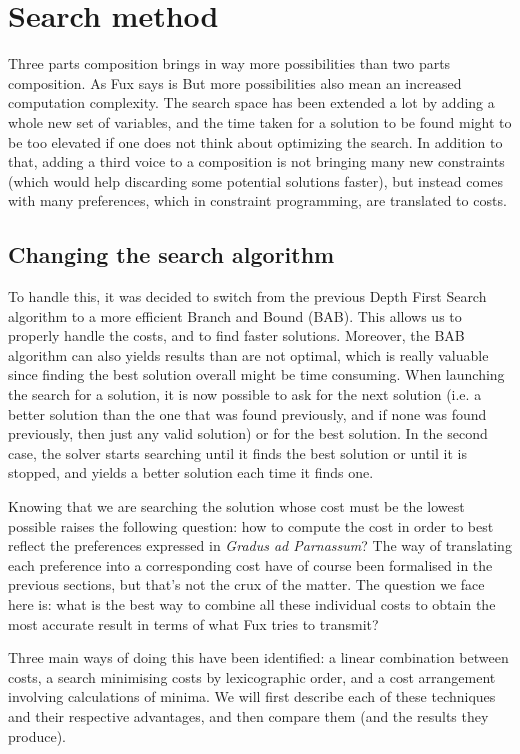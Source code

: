 \chapter{Search method}
Three parts composition brings in way more possibilities than two parts composition. As Fux says is %
But more possibilities also mean an increased computation complexity. The search space has been extended a lot by adding a whole new set of variables, and the time taken for a solution to be found might to be too elevated if one does not think about optimizing the search. In addition to that, adding a third voice to a composition is not bringing many new constraints (which would help discarding some potential solutions faster), but instead comes with many preferences, which in constraint programming, are translated to costs.

\section{Changing the search algorithm}

To handle this, it was decided to switch from the previous Depth First Search algorithm to a more efficient Branch and Bound (BAB). This allows us to properly handle the costs, and to find faster solutions. Moreover, the BAB algorithm can also yields results than are not optimal, which is really valuable since finding the best solution overall might be time consuming. When launching the search for a solution, it is now possible to ask for the next solution (i.e. a better solution than the one that was found previously, and if none was found previously, then just any valid solution) or for the best solution. In the second case, the solver starts searching until it finds the best solution or until it is stopped, and yields a better solution each time it finds one.

Knowing that we are searching the solution whose cost must be the lowest possible raises the following question: how to compute the cost in order to best reflect the preferences expressed in \textit{Gradus ad Parnassum}?
The way of translating each preference into a corresponding cost have of course been formalised in the previous sections, but that's not the crux of the matter. The question we face here is: what is the best way to combine all these individual costs to obtain the most accurate result in terms of what Fux tries to transmit?

Three main ways of doing this have been identified: a linear combination between costs, a search minimising costs by lexicographic order, and a cost arrangement involving calculations of minima. We will first describe each of these techniques and their respective advantages, and then compare them (and the results they produce).



